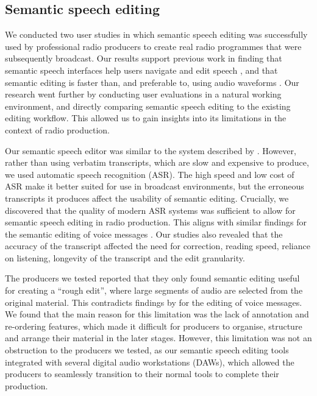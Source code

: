 \subsection{Semantic speech editing}

We conducted two user studies in which semantic speech editing was successfully used by professional radio producers to
create real radio programmes that were subsequently broadcast. Our results support previous work in finding that
semantic speech interfaces help users navigate and edit speech \citep{Whittaker2002}, and that semantic editing is
faster than, and preferable to, using audio waveforms \citep{Whittaker2004,Sivaraman2016}. Our research went further by
conducting user evaluations in a natural working environment, and directly comparing semantic speech editing to the
existing editing workflow. This allowed us to gain insights into its limitations in the context of radio production.

Our semantic speech editor was similar to the system described by \citet{Rubin2013}. However, rather than using
verbatim transcripts, which are slow and expensive to produce, we used automatic speech recognition (ASR). The high
speed and low cost of ASR make it better suited for use in broadcast environments, but the erroneous transcripts it
produces affect the usability of semantic editing.  Crucially, we discovered that the quality of modern ASR systems was
sufficient to allow for semantic speech editing in radio production.  This aligns with similar findings for the
semantic editing of voice messages \citep{Whittaker2004,Sivaraman2016}.  Our studies also revealed that the accuracy of
the transcript affected the need for correction, reading speed, reliance on listening, longevity of the transcript and
the edit granularity.

The producers we tested reported that they only found semantic editing useful for creating a ``rough edit'', where
large segments of audio are selected from the original material. This contradicts findings by \citet{Sivaraman2016} for
the editing of voice messages.
We found that the main reason for this limitation was the lack of annotation and re-ordering features, which made it
difficult for producers to organise, structure and arrange their material in the later stages.  However, this
limitation was not an obstruction to the producers we tested, as our semantic speech editing tools integrated with
several digital audio workstations (DAWs), which allowed the producers to seamlessly transition to their normal tools
to complete their production.


